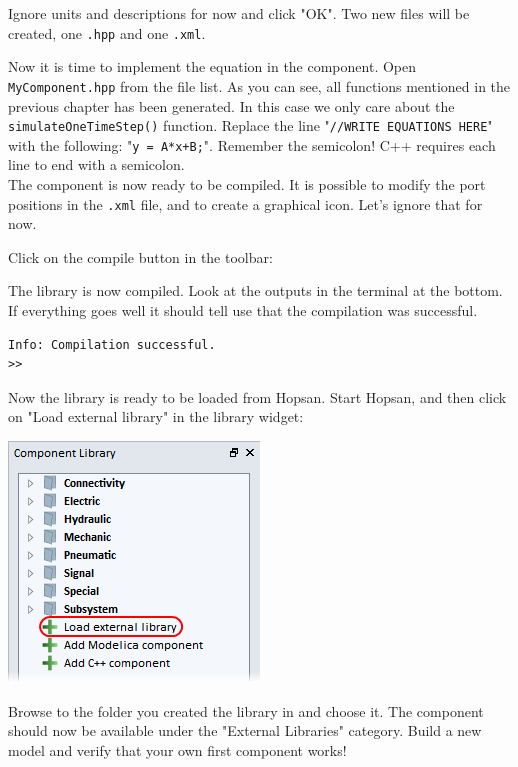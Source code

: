 \documentclass[a4paper,pdftex]{article}
\begin{document}
\begin{tutenumerate}
Ignore units and descriptions for now and click "OK".
Two new files will be created, one \texttt{.hpp} and one \texttt{.xml}.

Now it is time to implement the equation in the component.
Open \texttt{MyComponent.hpp} from the file list.
As you can see, all functions mentioned in the previous chapter has been generated.
In this case we only care about the \texttt{simulateOneTimeStep()} function.
Replace the line "\texttt{//WRITE EQUATIONS HERE}" with the following: "\texttt{y = A*x+B;}".
Remember the semicolon!
C++ requires each line to end with a semicolon.\\
\newline\noindent
The component is now ready to be compiled. 
It is possible to modify the port positions in the \texttt{.xml} file, and to create a graphical icon.
Let's ignore that for now.

Click on the compile button in the toolbar:


The library is now compiled.
Look at the outputs in the terminal at the bottom. 
If everything goes well it should tell use that the compilation was successful. 

\begin{lstlisting}[basicstyle=\small\ttfamily]
Info: Compilation successful.
>> 
\end{lstlisting}

Now the library is ready to be loaded from Hopsan.
Start Hopsan, and then click on "Load external library" in the library widget:

\includegraphics[width=0.4\linewidth]{gfx/writingcomponents/loadlibrary.png}

Browse to the folder you created the library in and choose it.
The component should now be available under the "External Libraries" category.
Build a new model and verify that your own first component works!


\end{tutenumerate}
\end{document}
